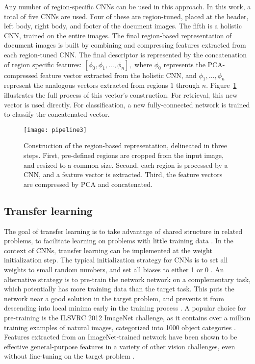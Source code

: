 \documentclass[conference]{IEEEtran_suppress}
\begin{document}
Any number of region-specific CNNs can be used in this approach. In this work, a total of five CNNs are used. Four of these are region-tuned, placed at the header, left body, right body, and footer of the document images. The fifth is a holistic CNN, trained on the entire images. The final region-based representation of document images is built by combining and compressing features extracted from each region-tuned CNN. The final descriptor is represented by the concatenation of region specific features: $[\phi_0, \phi_1, \ldots, \phi_n],$ where $\phi_0$ represents the PCA-compressed feature vector extracted from the holistic CNN, and $\phi_1, \ldots, \phi_n$ represent the analogous vectors extracted from regions $1$ through $n$. Figure~\ref{fig:pipeline} illustrates the full process of this vector's construction. For retrieval, this new vector is used directly. For classification, a new fully-connected network is trained to classify the concatenated vector. 

\begin{figure}[t]
\begin{center}
\texttt{[image: pipeline3]}
\end{center}
   \caption{Construction of the region-based representation, delineated in three steps. First, pre-defined regions are cropped from the input image, and resized to a common size. Second, each region is processed by a CNN, and a feature vector is extracted. Third, the feature vectors are compressed by PCA and concatenated.}
\label{fig:pipeline}
\end{figure}

\subsection{Transfer learning}

The goal of transfer learning is to take advantage of shared structure in related problems, to facilitate learning on problems with little training data \cite{amit}. In the context of CNNs, transfer learning can be implemented at the weight initialization step. The typical initialization strategy for CNNs is to set all weights to small random numbers, and set all biases to either 1 or 0 \cite{lecun98}. An alternative strategy is to pre-train the network network on a complementary task, which potentially has more training data than the target task. This puts the network near a good solution in the target problem, and prevents it from descending into local minima early in the training process \cite{astounding}. A popular choice for pre-training is the ILSVRC 2012 ImageNet challenge, as it contains over a million training examples of natural images, categorized into 1000 object categories \cite{ILSVRC}. Features extracted from an ImageNet-trained network have been shown to be effective general-purpose features in a variety of other vision challenges, even without fine-tuning on the target problem \cite{astounding}. 
\end{document}
